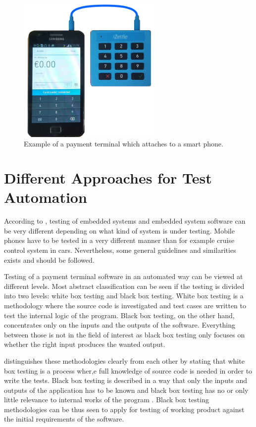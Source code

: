 \begin{figure}[ht]
  \begin{center}
    \includegraphics[width=7cm]{images/izettle.png}
    \caption{Example of a payment terminal which attaches to a smart phone.}
    \label{fig:izettle}
  \end{center}
\end{figure}

\section{Different Approaches for Test Automation}
\label{section:test automation approaches}

According to \cite{broekman2003testing}, testing of embedded systems and embedded system software can be very different depending on what kind of system is under testing. Mobile phones have to be tested in a very different manner than for example cruise control system in cars. Nevertheless, some general guidelines and similarities exists and should be followed.

Testing of a payment terminal software in an automated way can be viewed at different levels. Most abstract classification can be seen if the testing is divided into two levels: white box testing and black box testing. White box testing is a methodology where the source code is investigated and test cases are written to test the internal logic of the program. Black box testing, on the other hand, concentrates only on the inputs and the outputs of the software. Everything between those is not in the field of interest as black box testing only focuses on whether the right input produces the wanted output. \citep{nguyen2001testing,myers2011art}

\cite{khan2012comparative} distinguishes these methodologies clearly from each other by stating that white box testing is a process wher,e full knowledge of source code is needed in order to write the tests. Black box testing is described in a way that only the inputs and outputs of the application has to be known and black box testing has no or only little relevance to internal works of the program \citep{pressman2005software}. Black box testing methodologies can be thus seen to apply for testing of working product against the initial requirements of the software.

